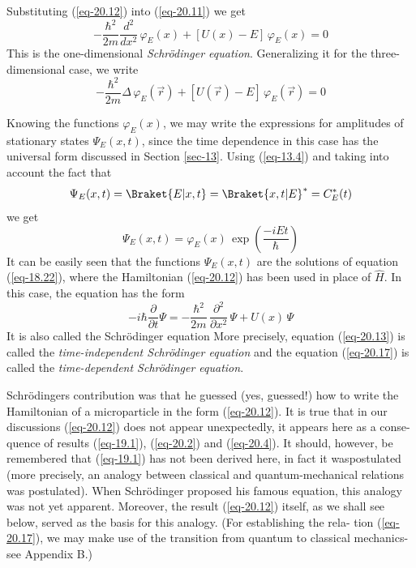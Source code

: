 \documentclass[a4paper,sfsidenotes,colorlinks=true]{tufte-book}
\numberwithin{equation}{section}
\numberwithin{figure}{section}
\begin{document}
Substituting (\ref{eq-20.12}) into (\ref{eq-20.11}) we get
\begin{equation}%
- \frac{\hbar^{2}}{2m} \frac{d^{2}}{dx^{2}} \, \varphi_{E}(x)+ \left[
  U(x) - E \right] \, \varphi_{E}(x) = 0
\label{eq-20.13}
\end{equation}
This is the one-dimensional \emph{Schr\"odinger equation}. Generalizing it for the
three-dimensional case, we write
\begin{equation}%
- \frac{\hbar^{2}}{2m} \Delta \, \varphi_{E}(\vec{r})+ \left[
  U(\vec{r}) - E \right] \, \varphi_{E}(\vec{r}) = 0
\label{eq-20.14}
\end{equation}

Knowing the functions $\varphi_{E}(x)$, we may write the expressions
for amplitudes of stationary states $\Psi_{E} (x, t)$, since the time
dependence in this case has the universal form discussed in Section
\ref{sec-13}. Using (\ref{eq-13.4}) and taking into account the fact
that
\begin{equation}%
\Psi_{E} (x,t) = \Braket{E| x,t} = \Braket{x,t | E}^{*} = C_{E}^{*} (t)
\label{eq-20.15}
\end{equation}
we get 
\begin{equation}%
\Psi_{E} (x,t) = \varphi_{E} (x) \, \exp \left( \frac{-i Et}{\hbar}\right) 
\label{eq-20.16}
\end{equation}
It can be easily seen that the functions $\Psi_{E}(x,t)$ are the
solutions of equation (\ref{eq-18.22}), where the Hamiltonian
(\ref{eq-20.12}) has been used in place of $\hat{H}$. In this case,
the equation has the form
\begin{equation}%
- i \hbar \frac{\partial}{\partial t} \Psi = -\frac{\hbar^{2}}{2m}  \,
\frac{\partial^{2}}{\partial x^{2}}\, \Psi + U(x) \, \Psi
\label{eq-20.17}
\end{equation}
It is also called the Schr\"odinger equation More precisely, equation
(\ref{eq-20.13}) is called the \emph{time-independent Schr\"odinger equation}
and the equation (\ref{eq-20.17}) is called the \emph{time-dependent
Schr\"odinger equation}.


Schr\"odingers contribution was that he guessed (yes, guessed!) how to
write the Hamiltonian of a microparticle in the form (\ref{eq-20.12}). It is
true that in our discussions (\ref{eq-20.12}) does not appear unexpectedly, it
appears here as a conse- quence of results (\ref{eq-19.1}), (\ref{eq-20.2}) and
(\ref{eq-20.4}). It should, however, be remembered that (\ref{eq-19.1}) has not been
derived here, in fact it waspostulated (more precisely, an analogy
between classical and quantum-mechanical relations was
postulated). When Schr\"odinger proposed his famous equation, this
analogy was not yet apparent. Moreover, the result (\ref{eq-20.12}) itself, as
we shall see below, served as the basis for this analogy. (For
establishing the rela- tion (\ref{eq-20.17}), we may make use of the transition
from quantum to classical mechanics-see Appendix B.) 
\end{document}
